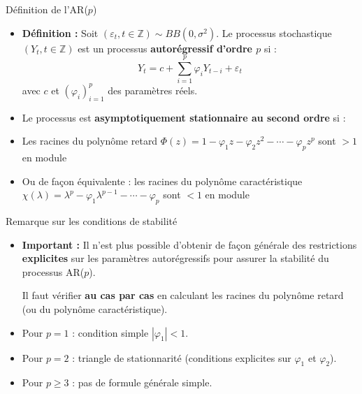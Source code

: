 \documentclass[11pt,aspectratio=169]{beamer}
\newcommand{\Z}{\mathbb{Z}}
\begin{document}
\begin{frame}{Définition de l'AR($p$)}

\begin{itemize}

\item \textbf{Définition :} Soit $(\varepsilon_t, t \in \Z) \sim BB(0, \sigma^2)$. Le processus stochastique $(Y_t, t \in \Z)$ est un processus \textbf{autorégressif d'ordre $p$} si :
\[
Y_t = c + \sum_{i=1}^{p} \varphi_i Y_{t-i} + \varepsilon_t
\]
avec $c$ et $(\varphi_i)_{i=1}^{p}$ des paramètres réels.\newline

\item Le processus est \textbf{asymptotiquement stationnaire au second ordre} si :\newline

\item Les racines du polynôme retard $\Phi(z) = 1 - \varphi_1 z - \varphi_2 z^2 - \cdots - \varphi_p z^p$ sont $> 1$ en module\newline

\item Ou de façon équivalente : les racines du polynôme caractéristique $\chi(\lambda) = \lambda^p - \varphi_1 \lambda^{p-1} - \cdots - \varphi_p$ sont $< 1$ en module

\end{itemize}
\end{frame}

\begin{frame}{Remarque sur les conditions de stabilité}

\begin{itemize}

\item \textbf{Important :} Il n'est plus possible d'obtenir de façon générale des restrictions \textbf{explicites} sur les paramètres autorégressifs pour assurer la stabilité du processus AR($p$).



Il faut vérifier \textbf{au cas par cas} en calculant les racines du polynôme retard (ou du polynôme caractéristique).\newline

\item Pour $p = 1$ : condition simple $|\varphi_1| < 1$.\newline

\item Pour $p = 2$ : triangle de stationnarité (conditions explicites sur $\varphi_1$ et $\varphi_2$).\newline

\item Pour $p \geq 3$ : pas de formule générale simple.

\end{itemize}
\end{frame}
\end{document}

